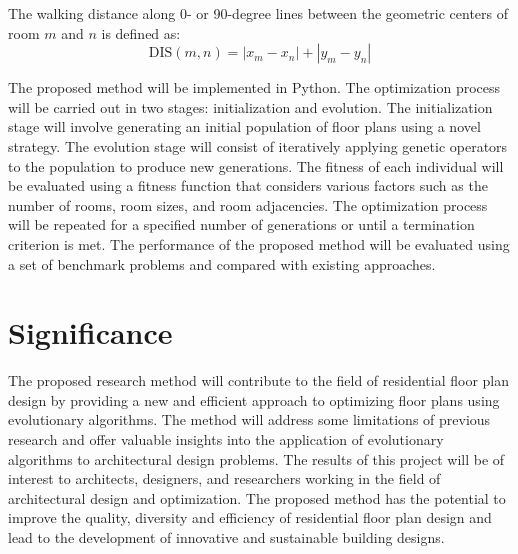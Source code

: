 \documentclass[]{article}
\begin{document}
The walking distance along 0- or 90-degree lines between the geometric centers of room $m$ and $n$ is defined as:
\begin{equation*}
\text{DIS}(m, n) = |x_m - x_n| + |y_m - y_n|
\end{equation*}


The proposed method will be implemented in Python. The optimization process will be carried out in two stages: initialization and evolution. The initialization stage will involve generating an initial population of floor plans using a novel strategy. The evolution stage will consist of iteratively applying genetic operators to the population to produce new generations. The fitness of each individual will be evaluated using a fitness function that considers various factors such as the number of rooms, room sizes, and room adjacencies. The optimization process will be repeated for a specified number of generations or until a termination criterion is met. The performance of the proposed method will be evaluated using a set of benchmark problems and compared with existing approaches.

\section{Significance}
The proposed research method will contribute to the field of residential floor plan design by providing a new and efficient approach to optimizing floor plans using evolutionary algorithms. The method will address some limitations of previous research and offer valuable insights into the application of evolutionary algorithms to architectural design problems. The results of this project will be of interest to architects, designers, and researchers working in the field of architectural design and optimization. The proposed method has the potential to improve the quality, diversity and efficiency of residential floor plan design and lead to the development of innovative and sustainable building designs.
\end{document}
